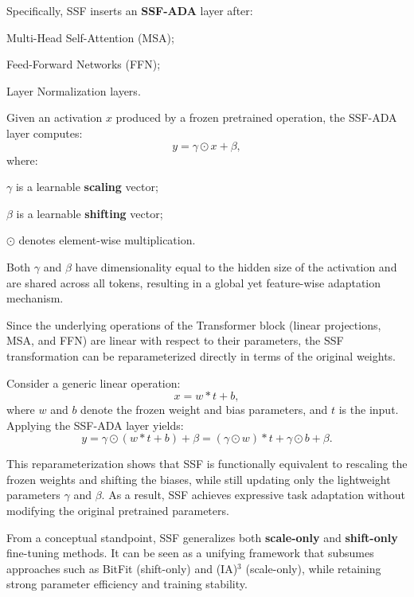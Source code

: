 Specifically, SSF inserts an \textbf{SSF-ADA} layer after:
\begin{compactitemize}
    \item Multi-Head Self-Attention (MSA);
    \item Feed-Forward Networks (FFN);
    \item Layer Normalization layers.
\end{compactitemize}

Given an activation $x$ produced by a frozen pretrained operation, the SSF-ADA layer computes:
\[
y = \gamma \odot x + \beta,
\]
where:
\begin{compactitemize}
    \item $\gamma$ is a learnable \textbf{scaling} vector;
    \item $\beta$ is a learnable \textbf{shifting} vector;
    \item $\odot$ denotes element-wise multiplication.
\end{compactitemize}

Both $\gamma$ and $\beta$ have dimensionality equal to the hidden size of the activation and are
shared across all tokens, resulting in a global yet feature-wise adaptation mechanism.

Since the underlying operations of the Transformer block (linear projections, MSA, and FFN) are
linear with respect to their parameters, the SSF transformation can be reparameterized directly
in terms of the original weights.

Consider a generic linear operation:
\[
x = w * t + b,
\]
where $w$ and $b$ denote the frozen weight and bias parameters, and $t$ is the input. Applying
the SSF-ADA layer yields:
\[
y = \gamma \odot (w * t + b) + \beta
     = (\gamma \odot w) * t + \gamma \odot b + \beta.
\]

This reparameterization shows that SSF is functionally equivalent to rescaling the frozen
weights and shifting the biases, while still updating only the lightweight parameters
$\gamma$ and $\beta$. As a result, SSF achieves expressive task adaptation without modifying the
original pretrained parameters.

From a conceptual standpoint, SSF generalizes both \textbf{scale-only} and \textbf{shift-only}
fine-tuning methods. It can be seen as a unifying framework that subsumes approaches such as
BitFit (shift-only) and (IA)$^3$ (scale-only), while retaining strong parameter efficiency and
training stability.
